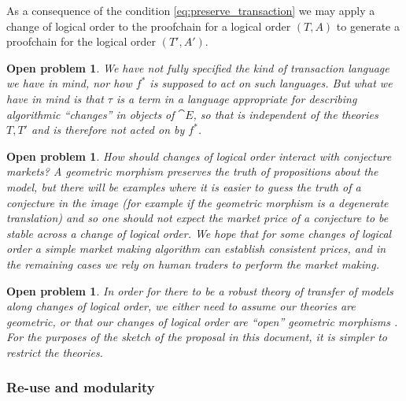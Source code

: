 \documentclass[english,letter paper,12pt,reqno]{article}
\theoremstyle{example}
\newtheorem{problem}[theorem]{Open problem}
\begin{document}
As a consequence of the condition \eqref{eq:preserve_transaction} we may apply a change of logical order to the proofchain for a logical order $(T,A)$ to generate a proofchain for the logical order $(T',A')$.


\begin{problem} We have not fully specified the kind of transaction language we have in mind, nor how $f^*$ is supposed to act on such languages. But what we have in mind is that $\tau$ is a term in a language appropriate for describing algorithmic ``changes'' in objects of $\cat{E}$, so that is independent of the theories $T,T'$ and is therefore not acted on by $f^*$.
\end{problem}

\begin{problem} How should changes of logical order interact with conjecture markets? A geometric morphism preserves the truth of propositions about the model, but there will be examples where it is \emph{easier} to guess the truth of a conjecture in the image (for example if the geometric morphism is a degenerate translation) and so one should not expect the market price of a conjecture to be stable across a change of logical order. We hope that for some changes of logical order a simple market making algorithm can establish consistent prices, and in the remaining cases we rely on human traders to perform the market making.
\end{problem}

\begin{problem} In order for there to be a robust theory of transfer of models along changes of logical order, we either need to assume our theories are geometric, or that our changes of logical order are ``open'' geometric morphisms \cite[\S X.3]{topos}. For the purposes of the sketch of the proposal in this document, it is simpler to restrict the theories.
\end{problem}

\subsubsection{Re-use and modularity}\label{section:reuse}
\end{document}
